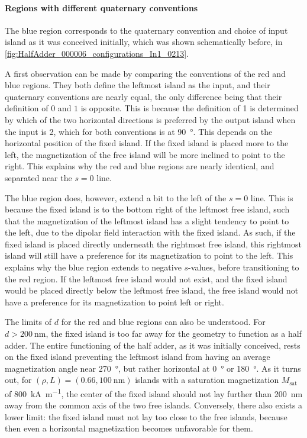 \documentclass[11pt,a4paper,english,twoside]{article}
\begin{document}
\paragraph{Regions with different quaternary conventions}
The blue region corresponds to the quaternary convention and choice of input island as it was conceived initially, which was shown schematically before, in \cref{fig:HalfAdder_000006_configurations_In1_0213}. \par
A first observation can be made by comparing the conventions of the red and blue regions. They both define the leftmost island as the input, and their quaternary conventions are nearly equal, the only difference being that their definition of $0$ and $1$ is opposite. This is because the definition of 1 is determined by which of the two horizontal directions is preferred by the output island when the input is 2, which for both conventions is at \SI{90}{\degree}. This depends on the horizontal position of the fixed island. If the fixed island is placed more to the left, the magnetization of the free island will be more inclined to point to the right. This explains why the red and blue regions are nearly identical, and separated near the $s=0$ line. \par
The blue region does, however, extend a bit to the left of the $s=0$ line. This is because the fixed island is to the bottom right of the leftmost free island, such that the magnetization of the leftmost island has a slight tendency to point to the left, due to the dipolar field interaction with the fixed island. As such, if the fixed island is placed directly underneath the rightmost free island, this rightmost island will still have a preference for its magnetization to point to the left. This explains why the blue region extends to negative $s$-values, before transitioning to the red region. If the leftmost free island would not exist, and the fixed island would be placed directly below the leftmost free island, the free island would not have a preference for its magnetization to point left or right. \par
The limits of $d$ for the red and blue regions can also be understood. For $d>\SI{200}{\nano\metre}$, the fixed island is too far away for the geometry to function as a half adder. The entire functioning of the half adder, as it was initially conceived, rests on the fixed island preventing the leftmost island from having an average magnetization angle near \SI{270}{\degree}, but rather horizontal at \SI{0}{\degree} or \SI{180}{\degree}. As it turns out, for $(\rho, L) = (0.66,\SI{100}{\nano\metre})$ islands with a saturation magnetization $M_\mathrm{sat}$ of \SI{800}{\kilo\ampere\per\metre}, the center of the fixed island should not lay further than \SI{200}{\nano\metre} away from the common axis of the two free islands. Conversely, there also exists a lower limit: the fixed island must not lay too close to the free islands, because then even a horizontal magnetization becomes unfavorable for them. \par
\end{document}
